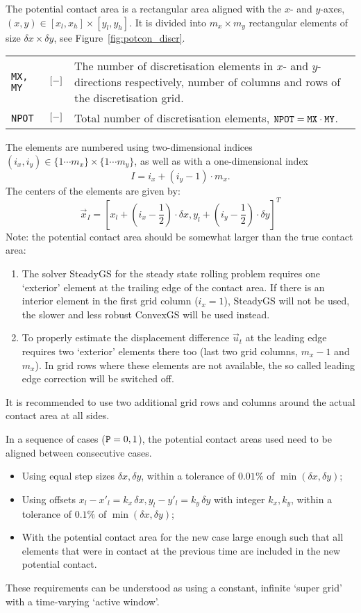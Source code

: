 \documentclass[12pt]{report}
\newenvironment{inputvars}{\vspace{0.4\baselineskip}%

\begin{tabular}{>{\raggedright}p{22mm}p{19mm}p{113mm}}}{
\end{tabular}

}
\newcommand{\inpvar}[3]{{\small\tt #1} & $#2$ & #3 \\[1ex]}
\begin{document}
The potential contact area is a rectangular area aligned with the $x$- and
$y$-axes, $(x,y)\in[x_l,x_h] \times[y_l,y_h]$. It is divided into
$m_x\times m_y$ rectangular elements of size $\delta x\times\delta y$, see
Figure~\ref{fig:potcon_discr}.
\begin{inputvars}
\inpvar{MX, MY}{\bunit{-}}{The number of discretisation elements in $x$- and
        $y$-directions respectively, number of columns and rows of the
        discretisation grid.}
\inpvar{NPOT}{\bunit{-}}{Total number of discretisation elements, ${\tt
        NPOT}={\tt MX}\cdot {\tt MY}$.}
\end{inputvars}
The elements are numbered using two-dimensional indices $(i_x,i_y)\in
\{1\cdots m_x\}\times\{1\cdots m_y\}$, as well as with a one-dimensional
index
\begin{equation}\label{eq:1d_index}
        I=i_x+(i_y-1)\cdot m_x .
\end{equation}
The centers of the elements are given by:
\begin{equation}\label{eq:x_i}
   \vec{x}_I = \left[ x_l+(i_x-\frac{1}{2})\cdot \delta x,
                y_l+(i_y-\frac{1}{2})\cdot \delta y \right]^T
\end{equation}
Note: the potential contact area should be somewhat larger than the true
contact area:
\begin{enumerate}
\item The solver SteadyGS for the steady state rolling problem requires one
        `exterior' element at the trailing edge of the contact area. If
        there is an interior element in the first grid column ($i_x=1$),
        SteadyGS will not be used, the slower and less robust ConvexGS will
        be used instead.
\item To properly estimate the displacement difference $\vec{u}_t$ at the
        leading edge requires two `exterior' elements there too (last two
        grid columns, $m_x-1$ and $m_x$). In grid rows where these
        elements are not available, the so called leading edge correction
        will be switched off.
\end{enumerate}
It is recommended to use two additional grid rows and columns around the
actual contact area at all sides.

In a sequence of cases (${\tt P}=0, 1$), the potential contact areas used
need to be aligned between consecutive cases.
\begin{itemize}
\item Using equal step sizes $\delta x, \delta y$, within a tolerance of
        $0.01\%$ of $\min(\delta x,\delta y)$;
\item Using offsets $x_l-x'_l=k_x\,\delta x, y_l-y'_l=
        k_y\,\delta y$ with integer $k_x, k_y$, within a tolerance of
        $0.1\%$ of $\min(\delta x,\delta y)$;
\item With the potential contact area for the new case large enough such
        that all elements that were in contact at the previous time are
        included in the new potential contact.
\end{itemize}
These requirements can be understood as using a constant, infinite `super
grid' with a time-varying `active window'.
\end{document}
